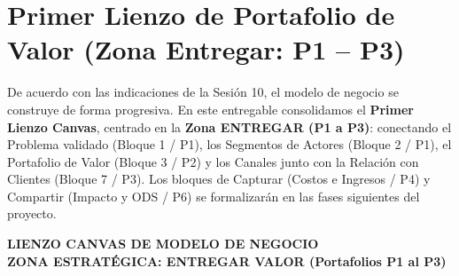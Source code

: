 \documentclass[11pt,a4paper]{article}
\begin{document}
\section{Primer Lienzo de Portafolio de Valor (Zona Entregar: P1 -- P3)}

\begin{tcolorbox}[colback=primary!5,colframe=primary,title={\textbf{Estructura Metodol\'ogica del Primer Lienzo}}]
De acuerdo con las indicaciones de la Sesi\'on 10, el modelo de negocio se construye de forma progresiva. En este entregable consolidamos el \textbf{Primer Lienzo Canvas}, centrado en la \textbf{Zona ENTREGAR (P1 a P3)}: conectando el Problema validado (Bloque 1 / P1), los Segmentos de Actores (Bloque 2 / P1), el Portafolio de Valor (Bloque 3 / P2) y los Canales junto con la Relaci\'on con Clientes (Bloque 7 / P3). Los bloques de Capturar (Costos e Ingresos / P4) y Compartir (Impacto y ODS / P6) se formalizar\'an en las fases siguientes del proyecto.
\end{tcolorbox}

\vspace{0.4cm}

\begin{tcolorbox}[colback=primary,colframe=primary,arc=2mm,halign=center]
    {\Large \textbf{\color{white} LIENZO CANVAS DE MODELO DE NEGOCIO}}\\[0.15cm]
    {\normalsize \textbf{\color{white!90} ZONA ESTRAT\'EGICA: ENTREGAR VALOR (Portafolios P1 al P3)}}
\end{tcolorbox}

\vspace{0.3cm}
\end{document}
